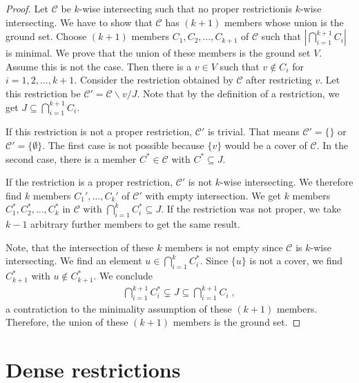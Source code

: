 \documentclass[a4paper, 12pt, twoside=false]{scrbook}
\theoremstyle{definition}
\begin{document}
   \begin{proof}
       Let $\mathcal{C}$ be $k$-wise intersecting such that no proper restrictionis $k$-wise intersecting.
       We have to show that $\mathcal{C}$ has $(k+1)$ members whose union is the ground set.
       Choose $(k+1)$ members $C_1, C_2, \ldots, C_{k+1}$ of $\mathcal{C}$ such that $|\bigcap_{i=1}^{k+1} C_i|$ is minimal.
       We prove that the union of these members is the ground set $V$.
       Assume this is not the case.
       Then there is a $v \in V$ such that $v \not\in C_i$ for $i=1,2, \ldots, k+1$.
       Consider the restriction obtained by $\mathcal{C}$ after restricting $v$.
       Let this restriction be $\mathcal{C'}=\mathcal{C} \backslash v / J$.
       Note that by the definition of a restriction, we get $J \subseteq \bigcap_{i=1}^{k+1} C_i$.

       If this restriction is not a proper restriction, $\mathcal{C'}$ is trivial.
       That means $\mathcal{C'}=\{\}$ or $\mathcal{C'}=\{\emptyset\}$.
       The first case is not possible because $\{v\}$ would be a cover of $\mathcal{C}$.
       In the second case, there is a member $C^* \in \mathcal{C}$ with $C^* \subseteq J$.

       If the restriction is a proper restriction, $\mathcal{C'}$ is not $k$-wise intersecting. We therefore find $k$ members $C_1',\ldots, C_k'$ of $\mathcal{C'}$ with empty intersection. We get $k$ members $C_1^*, C_2^*,\ldots, C_k^*$ in $\mathcal{C}$ with $\bigcap_{i=1}^k C_i^* \subseteq J$.
       If the restriction was not proper, we take $k-1$ arbitrary further members to get the same result.

       Note, that the intersection of these $k$ members is not empty since $\mathcal{C}$ is $k$-wise intersecting.
       We find an element $u \in \bigcap_{i=1}^k C_i^*$. Since $\{u\}$ is not a cover, we find $C_{k+1}^*$ with $u \not\in C_{k+1}^*$.
       We conclude
       \begin{align*}
           \bigcap_{i=1}^{k+1} C_i^* \subsetneq J \subseteq \bigcap_{i=1}^{k+1} C_i \;,
       \end{align*}
       a contratiction to the minimality assumption of these $(k+1)$ members.
       Therefore, the union of these $(k+1)$ members is the ground set.


   \end{proof}

   \chapter{Dense restrictions}
\end{document}
